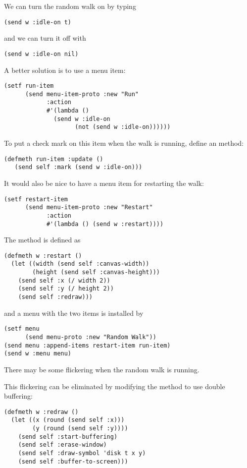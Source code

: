 \begin{slide}{}
We can turn the random walk on by typing
{\Large
\begin{verbatim}
(send w :idle-on t)
\end{verbatim}}
and we can turn it off with
{\Large
\begin{verbatim}
(send w :idle-on nil)
\end{verbatim}}
A better solution is to use a menu item:
{\Large
\begin{verbatim}
(setf run-item
      (send menu-item-proto :new "Run"
            :action 
            #'(lambda ()
              (send w :idle-on
                    (not (send w :idle-on))))))
\end{verbatim}}
To put a check mark on this item when the walk is running, define
an  method:
{\Large
\begin{verbatim}
(defmeth run-item :update ()
   (send self :mark (send w :idle-on)))
\end{verbatim}}
\end{slide}

\begin{slide}{}
It would also be nice to have a menu item for restarting the walk:
{\Large
\begin{verbatim}
(setf restart-item
      (send menu-item-proto :new "Restart"
            :action
            #'(lambda () (send w :restart))))
\end{verbatim}}
The  method is defined as
{\Large
\begin{verbatim}
(defmeth w :restart ()
  (let ((width (send self :canvas-width))
        (height (send self :canvas-height)))
    (send self :x (/ width 2))
    (send self :y (/ height 2))
    (send self :redraw)))
\end{verbatim}}
and a menu with the two items is installed by
{\Large
\begin{verbatim}
(setf menu
      (send menu-proto :new "Random Walk"))
(send menu :append-items restart-item run-item)
(send w :menu menu)
\end{verbatim}}
\end{slide}

\begin{slide}{}
There may be some flickering when the random walk is running.

This flickering can be eliminated by modifying the 
method to use double buffering:
{\Large
\begin{verbatim}
(defmeth w :redraw ()
  (let ((x (round (send self :x)))
        (y (round (send self :y))))
    (send self :start-buffering)
    (send self :erase-window)
    (send self :draw-symbol 'disk t x y)
    (send self :buffer-to-screen)))
\end{verbatim}}
\end{slide}

